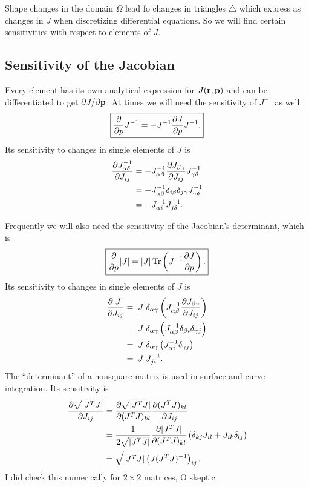 Shape changes in the domain $\Omega$ lead fo changes in triangles $\bigtriangleup$ which express as changes in $J$ when discretizing differential equations.  So we will find certain sensitivities with respect to elements of $J$.

\subsection{Sensitivity of the Jacobian}

Every element has its own analytical expression for $J(\textbf{r}; \textbf{p})$ and can be differentiated to get $\partial{J}/\partial{\textbf{p}}$.  At times we will need the sensitivity of $J^{-1}$ as well,
%
\begin{equation}
\boxed{
\frac{\partial{}}{\partial{p}} J^{-1} = - J^{-1} \frac{\partial{J}}{\partial{p}} J^{-1}.
}
\end{equation}
%
Its sensitivity to changes in single elements of $J$ is
%
\begin{equation}
\begin{aligned}
\frac{\partial{J^{-1}_{\alpha \delta}}}{\partial{J_{ij}}} &= -J^{-1}_{\alpha \beta} \frac{\partial{J_{\beta \gamma}}}{\partial{J_{ij}}} J^{-1}_{\gamma \delta} \\
&= -J^{-1}_{\alpha \beta} \delta_{i \beta} \delta_{j \gamma} J^{-1}_{\gamma \delta} \\
&= -J^{-1}_{\alpha i} J^{-1}_{j \delta}.
\end{aligned}
\end{equation}

%
Frequently we will also need the sensitivity of the Jacobian's determinant, which is
%
\begin{equation}
\boxed{
\frac{\partial{}}{\partial{p}} |J| = |J| \operatorname{Tr} \left( J^{-1} \frac{\partial{J}}{\partial{p}} \right).
}
\end{equation}
%
Its sensitivity to changes in single elements of $J$ is
%
\begin{equation}
\begin{aligned}
\frac{\partial{|J|}}{\partial{J_{i j}}} &= |J| \delta_{\alpha \gamma} \left(  J^{-1}_{\alpha \beta} \frac{\partial{J_{\beta \gamma}}}{\partial{J_{i j}}} \right) \\
&= |J| \delta_{\alpha \gamma} \left( J^{-1}_{\alpha \beta} \delta_{\beta i} \delta_{\gamma j} \right) \\
&= |J| \delta_{\alpha \gamma} \left( J^{-1}_{\alpha i} \delta_{\gamma j} \right) \\
&= |J| J^{-1}_{ji}.
\end{aligned}
\end{equation}
%
The ``determinant'' of a nonsquare matrix is used in surface and curve integration.  Its sensitivity is
%
\begin{equation}
\begin{aligned}
\frac{\partial{\sqrt{| J^T J |}}}{\partial{J_{ij}}} &= \frac{\partial{\sqrt{|J^T J|}}}{\partial{(J^TJ)_{kl}}} \frac{\partial{(J^TJ)_{kl}}}{\partial{J_{ij}}} \\
&= \frac{1}{2\sqrt{|J^TJ|}} \frac{\partial{|J^T J|}}{\partial{(J^TJ)_{kl}}} \left( \delta_{k j} J_{i l} + J_{i k} \delta_{l j} \right) \\
&= \sqrt{|J^TJ|} \left( J (J^T J)^{-1} \right)_{ij}.
\end{aligned}
\end{equation}
%
I did check this numerically for $2 \times 2$ matrices, O skeptic.


